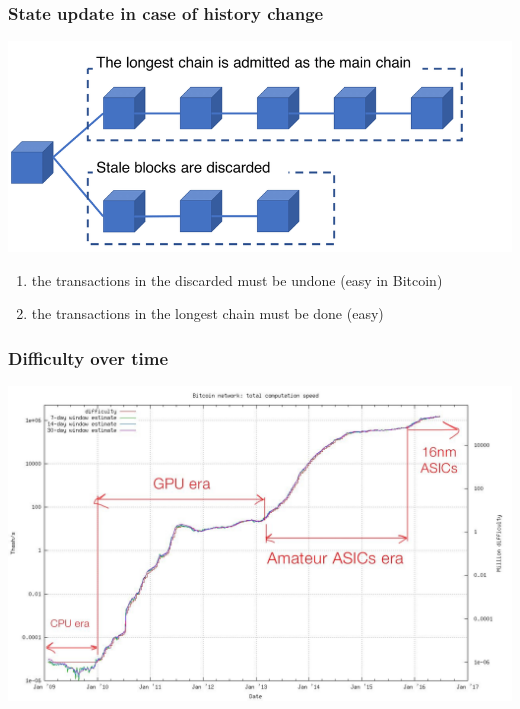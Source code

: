 \documentclass[11pt]{beamer}  %
\begin{document}
\begin{frame}\frametitle{State update in case of history change}

    \begin{center}
      \includegraphics[width=\textwidth,clip=false]{pictures/longest.png}
    \end{center}

    \begin{enumerate}
    \item the transactions in the discarded must be undone (easy in Bitcoin)
    \item the transactions in the longest chain must be done (easy)
    \end{enumerate}
    
\end{frame}

\begin{frame}\frametitle{Difficulty over time}

  \begin{center}
    \includegraphics[width=\textwidth,clip=false]{pictures/difficulty.jpg}
  \end{center}

\end{frame}
\end{document}

